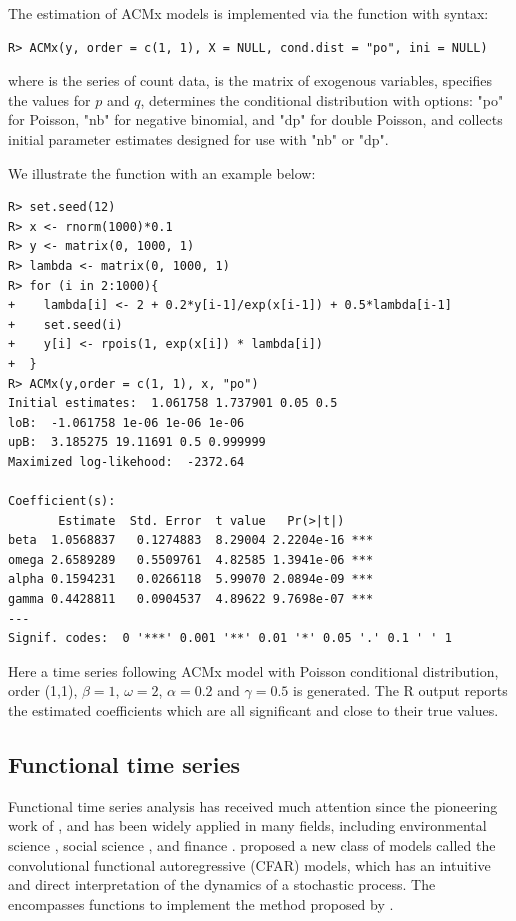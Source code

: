 The estimation of ACMx models is implemented via the function  with syntax:
\begin{verbatim}
R> ACMx(y, order = c(1, 1), X = NULL, cond.dist = "po", ini = NULL)
\end{verbatim}
where  is the series of count data,  is the matrix of exogenous variables,  specifies the values for $p$ and $q$,  determines the conditional distribution with options: "po" for Poisson, "nb" for negative binomial, and "dp" for double Poisson,
and  collects initial parameter estimates designed for use with "nb" or "dp".


We illustrate the function  with an example below:
\begin{verbatim}
R> set.seed(12)
R> x <- rnorm(1000)*0.1
R> y <- matrix(0, 1000, 1)
R> lambda <- matrix(0, 1000, 1)
R> for (i in 2:1000){
+    lambda[i] <- 2 + 0.2*y[i-1]/exp(x[i-1]) + 0.5*lambda[i-1]
+    set.seed(i)
+    y[i] <- rpois(1, exp(x[i]) * lambda[i])
+  }
R> ACMx(y,order = c(1, 1), x, "po")
Initial estimates:  1.061758 1.737901 0.05 0.5 
loB:  -1.061758 1e-06 1e-06 1e-06 
upB:  3.185275 19.11691 0.5 0.999999 
Maximized log-likehood:  -2372.64 

Coefficient(s):
       Estimate  Std. Error  t value   Pr(>|t|)    
beta  1.0568837   0.1274883  8.29004 2.2204e-16 ***
omega 2.6589289   0.5509761  4.82585 1.3941e-06 ***
alpha 0.1594231   0.0266118  5.99070 2.0894e-09 ***
gamma 0.4428811   0.0904537  4.89622 9.7698e-07 ***
---
Signif. codes:  0 '***' 0.001 '**' 0.01 '*' 0.05 '.' 0.1 ' ' 1
\end{verbatim}

Here a time series following ACMx model with Poisson conditional distribution, order (1,1), $\beta=1$, $\omega=2$, $\alpha=0.2$ and $\gamma=0.5$ is generated. The {R} output reports the estimated coefficients which are all significant and close to their true values.

\subsection{Functional time series}
Functional time series analysis has received much attention since the pioneering work of \cite{bosq2000}, and has been widely applied in many fields, including environmental science \citep{hormann2010}, social science \citep{hyndman2000}, and finance \citep{diebold2006,horvath2013}. \cite{liu2016functional} proposed a new class of models called the convolutional
functional autoregressive (CFAR) models, which has an intuitive
and direct interpretation of the dynamics of a stochastic process. The
 encompasses functions to implement the method proposed by \cite{liu2016functional}.


